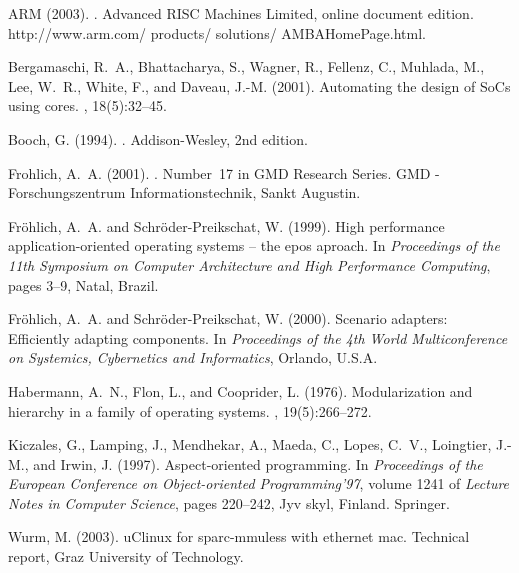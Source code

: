 \documentclass{kapproc} %
\begin{document}
\begin{chapthebibliography}{1}

ARM (2003).
.
\newblock Advanced RISC Machines Limited, online document edition.
\newblock http://www.arm.com/ products/ solutions/ AMBAHomePage.html.

Bergamaschi, R.~A., Bhattacharya, S., Wagner, R., Fellenz, C., Muhlada, M.,
  Lee, W.~R., White, F., and Daveau, J.-M. (2001).
\newblock Automating the design of SoCs using cores.
, 18(5):32--45.

Booch, G. (1994).
.
\newblock Addison-Wesley, 2nd edition.

Frohlich, A.~A. (2001).
.
\newblock Number~17 in GMD Research Series. GMD - Forschungszentrum
  Informationstechnik, Sankt Augustin.

Fr\"ohlich, A.~A. and Schr\"oder-Preikschat, W. (1999).
\newblock High performance application-oriented operating systems -- the epos
  aproach.
\newblock In {\em Proceedings of the 11th Symposium on Computer Architecture
  and High Performance Computing}, pages 3--9, Natal, Brazil.

Fr\"ohlich, A.~A. and Schr\"oder-Preikschat, W. (2000).
\newblock Scenario adapters: Efficiently adapting components.
\newblock In {\em Proceedings of the 4th World Multiconference on Systemics,
  Cybernetics and Informatics}, Orlando, U.S.A.

Habermann, A.~N., Flon, L., and Cooprider, L. (1976).
\newblock Modularization and hierarchy in a family of operating systems.
, 19(5):266--272.

Kiczales, G., Lamping, J., Mendhekar, A., Maeda, C., Lopes, C.~V., Loingtier,
  J.-M., and Irwin, J. (1997).
\newblock Aspect-oriented programming.
\newblock In {\em Proceedings of the European Conference on Object-oriented
  Programming'97}, volume 1241 of {\em Lecture Notes in Computer Science},
  pages 220--242, Jyv skyl, Finland. Springer.

Wurm, M. (2003).
\newblock uClinux for sparc-mmuless with ethernet mac.
\newblock Technical report, Graz University of Technology.


\end{chapthebibliography}
\end{document}
